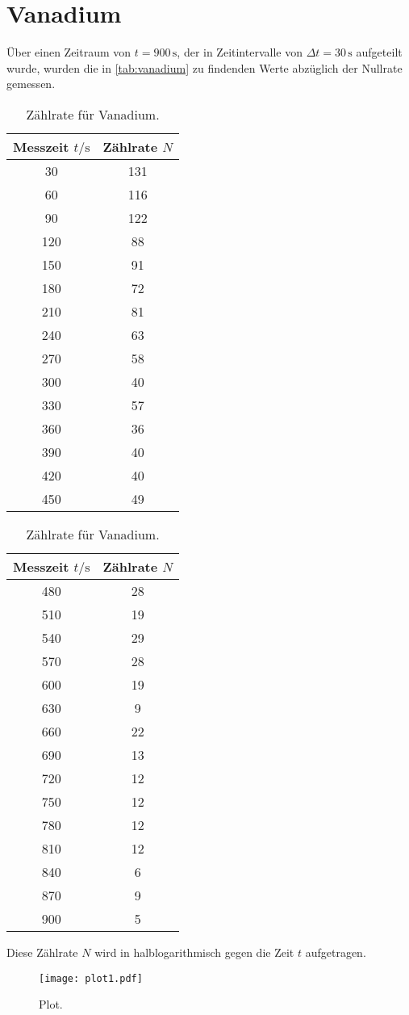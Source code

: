 \section{Vanadium}
\label{sec:Vanadium}
Über einen Zeitraum von $t=900\,\unit{\second}$, der in Zeitintervalle von $\Delta t = 30\,\unit{\second}$
aufgeteilt wurde, wurden die in \autoref{tab:vanadium} zu findenden Werte abzüglich der Nullrate gemessen.
\begin{table}
  \centering
  \begin{tabular}{c c}
    \toprule
    Messzeit $t/\unit{\second}$ & Zählrate $N$\\
    \midrule
     30 & 131 \\
     60 & 116 \\
     90 & 122 \\
    120 &  88 \\
    150 &  91 \\
    180 &  72 \\
    210 &  81 \\
    240 &  63 \\
    270 &  58 \\
    300 &  40 \\
    330 &  57 \\
    360 &  36 \\
    390 &  40 \\
    420 &  40 \\
    450 &  49 \\
    \bottomrule
  \end{tabular}
  \begin{tabular}{c c}
    \toprule
    Messzeit $t/\unit{\second}$ & Zählrate $N$\\
    \midrule
    480 &  28 \\
    510 &  19 \\
    540 &  29 \\
    570 &  28 \\
    600 &  19 \\
    630 &   9 \\
    660 &  22 \\
    690 &  13 \\
    720 &  12 \\
    750 &  12 \\
    780 &  12 \\
    810 &  12 \\
    840 &   6 \\
    870 &   9 \\
    900 &   5 \\
    \bottomrule
  \end{tabular}
  \caption{Zählrate für Vanadium.}
  \label{tab:vanadium}
\end{table}
Diese Zählrate $N$ wird in halblogarithmisch gegen die Zeit $t$ aufgetragen.

\begin{figure}
  \centering
  \texttt{[image: plot1.pdf]}
  \caption{Plot.}
  \label{fig:plot}
\end{figure}